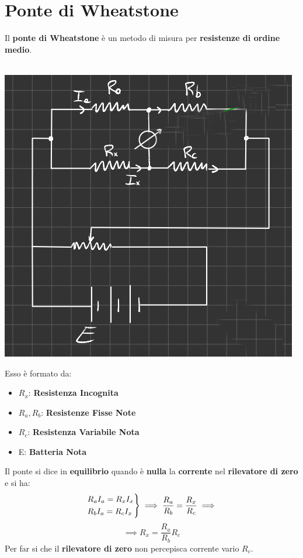 \chapter{Ponte di Wheatstone}
Il \textbf{ponte di Wheatstone} è un metodo di misura per \textbf{resistenze di ordine medio}.\\ \\
\begin{center}
    \includegraphics[width=.6\textwidth]{Images/figure5.png}
\end{center}
Esso è formato da:
\begin{itemize}
    \item $R_x$: \textbf{Resistenza Incognita}
    \item $R_a, R_b$: \textbf{Resistenze Fisse Note}
    \item $R_c$: \textbf{Resistenza Variabile Nota}
    \item E: \textbf{Batteria Nota}
\end{itemize}
Il ponte si dice in \textbf{equilibrio} quando è \textbf{nulla} la \textbf{corrente} nel \textbf{rilevatore di zero} e si ha:
\begin{equation*}
    \begin{rcases}
        R_a I_a = R_x I_x\\
        R_b I_a = R_c I_x
    \end{rcases}
    \implies 
    \frac{R_a}{R_b} = \frac{R_x}{R_c} \implies
\end{equation*}
\begin{equation*}
    \implies R_x = \frac{R_a}{R_b} R_c
\end{equation*}
Per far si che il \textbf{rilevatore di zero} non percepisca corrente vario $R_c$.
